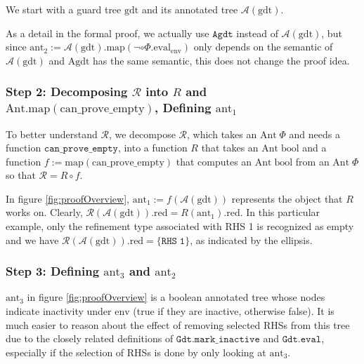 We start with a guard tree $\mathrm{gdt}$ and its annotated tree $\mathcal{A}(\mathrm{gdt})$.

As a detail in the formal proof, we actually use $\mathtt{Agdt}$ instead of $\mathcal{A}(\mathrm{gdt})$, but since $\mathrm{ant_2} := \mathcal{A}(\mathrm{gdt}).\mathrm{map}(\neg \circ \Phi.\mathrm{eval}_{\mathrm{env}})$
only depends on the semantic of $\mathcal{A}(\mathrm{gdt})$ and $\mathrm{Agdt}$ has the same semantic, this does not change the proof idea.


\subsubsection{Step 2: Decomposing $\mathcal{R}$ into $R$ and $\mathrm{Ant.map}(\mathrm{can\_prove\_empty})$, Defining $\mathrm{ant}_1$}

To better understand $\mathcal{R}$, we decompose $\mathcal{R}$, which takes an $\mathrm{Ant}\;\Phi$ and needs a function $\mathtt{can\_prove\_empty}$,
into a function $R$ that takes an $\mathrm{Ant}\;\mathrm{bool}$
and a function $f :=  \mathrm{map}(\mathrm{can\_prove\_empty})$ that computes an
$\mathrm{Ant}\;\mathrm{bool}$ from an $\mathrm{Ant}\;\Phi$ so that $\mathcal{R} = R \circ f$.

In figure \ref{fig:proofOverview}, $\mathrm{ant}_1 := f(\mathcal{A}(\mathrm{gdt}))$ represents the object that $R$ works on.
Clearly, $\mathcal{R}(\mathcal{A}(\mathrm{gdt}))\mathrm{.red} = R(\mathrm{ant_1})\mathrm{.red}$.
In this particular example, only the refinement type associated with RHS 1 is recognized as empty and we have
$\mathcal{R}(\mathcal{A}(\mathrm{gdt}))\mathrm{.red} = \{ \mathtt{RHS\;1} \}$, as indicated by the ellipsis.


\subsubsection{Step 3: Defining $\mathrm{ant}_3$ and $\mathrm{ant}_2$}

$\mathrm{ant}_3$ in figure \ref{fig:proofOverview} is a boolean annotated tree whose nodes indicate inactivity under $\mathrm{env}$ (true if they are inactive, otherwise false).
It is much easier to reason about the effect of removing selected RHSs from this tree due to the closely related definitions of $\mathtt{Gdt.mark\_inactive}$ and $\mathtt{Gdt.eval}$, especially if the selection of RHSs is done by only looking at $\mathrm{ant}_3$.

